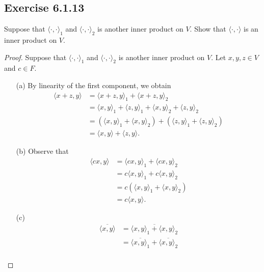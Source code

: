 \subsection*{Exercise 6.1.13} Suppose that \( \langle \cdot  ,  \cdot  \rangle_{1} \) and \( \langle \cdot  ,  \cdot  \rangle_{2} \) is another inner product on \( V  \). Show that \( \langle \cdot ,  \cdot  \rangle \) is an inner product on \( V  \).
\begin{proof}
  Suppose that \( \langle \cdot  ,  \cdot  \rangle_{1} \) and \( \langle \cdot  ,  \cdot  \rangle_{2} \) is another inner product on \( V  \). Let \( x,y,z \in V  \) and \( c \in F  \).
  \begin{enumerate}
      \item[(a)] By linearity of the first component, we obtain
          \begin{align*}
              \langle x + z  , y  \rangle &= \langle x + z  , y  \rangle_{1} + {\langle x + z  , y  \rangle}_{2}  \\
                                          &= \langle x  , y \rangle_{1} + \langle z , y \rangle_{1}  + \langle x  , y \rangle_{2} + \langle z  , y \rangle_{2} \\
                                          &= ({\langle x , y \rangle}_{1} + {\langle x , y \rangle}_{2}) + (\langle z , y \rangle_{1} + \langle z  , y \rangle_{2}  ) \\
                                          &= \langle x  , y \rangle + \langle z , y \rangle.
          \end{align*}
        \item[(b)] Observe that
            \begin{align*}
                \langle cx , y \rangle &= \langle cx , y \rangle_{1} + \langle cx , y \rangle_{2} \\
                                       &=  c \langle x , y \rangle_{1} + c \langle x , y \rangle_{2} \\
                                       &= c (\langle x , y \rangle_{1} + \langle x , y \rangle_{2}) \\
                                       &=  c \langle x , y \rangle.
            \end{align*}
        \item[(c)] 
            \begin{align*}
                \overline{\langle x , y \rangle} &= \overline{\langle x , y \rangle_{1} + \langle x , y \rangle_{2}} \\
                                                 &=  \overline{\langle x , y \rangle_{1}} + \overline{\langle x , y \rangle_{2}} \\

\end{align*}
\end{enumerate}
\end{proof}
